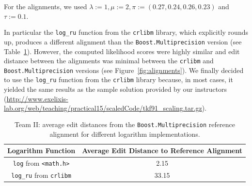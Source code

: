 \documentclass[runningheads,a4paper]{llncs}
\begin{document}
For the alignments, we used $\lambda:=1, \mu:=2, \pi:= (0.27, 0.24, 0.26, 0.23)$ and $\tau := 0.1$.

In particular the \texttt{log\_ru} function from the \texttt{crlibm} library, 
which explicitly rounds up, produces a different alignment than the
\texttt{Boost.Multiprecision} version (see Table~\ref{fig:dist}).
However, the computed likelihood scores were highly similar and edit distance between the alignments was minimal 
between the \texttt{crlibm} and \texttt{Boost.Multiprecision} versions (see Figure~\ref{fig:alignments}).
We finally decided to use the \texttt{log\_ru} function from the \texttt{crlibm} library because, in most cases, it yielded the same results as the sample
solution provided by our instructors ({\small \url{http://www.exelixis-lab.org/web/teaching/practical15/scaledCode/tkf91_scaling.tar.gz}}). 

\begin{table}[h!]

\centering

\begin{tabular}{|c|c|}
\hline
Logarithm Function & Average Edit Distance to Reference Alignment\\
\hline
\texttt{log} from \texttt{<math.h>} & 2.15 \\
\hline
\texttt{log\_ru} from \texttt{crlibm} & 33.15 \\
\hline
\end{tabular}
\caption{Team II: average edit distances from the \texttt{Boost.Multiprecision} reference alignment for different logarithm implementations.}
\label{fig:dist}
\end{table}
\end{document}
